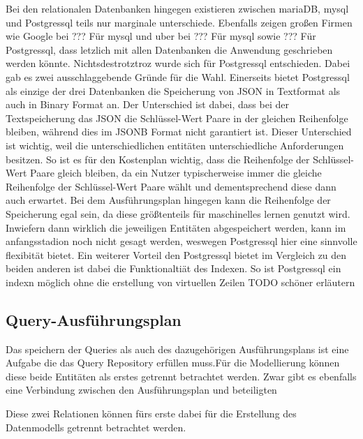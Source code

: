 Bei den relationalen Datenbanken hingegen existieren zwischen mariaDB, mysql und Postgressql teils nur marginale unterschiede. Ebenfalls zeigen großen Firmen wie Google bei ??? Für mysql und uber bei ??? Für mysql sowie ??? Für Postgressql, dass letzlich mit allen Datenbanken die Anwendung geschrieben werden könnte. Nichtsdestrotztroz wurde sich für Postgressql entschieden. Dabei gab es zwei ausschlaggebende Gründe für die Wahl. Einerseits bietet Postgressql als einzige der drei Datenbanken die Speicherung von JSON in Textformat als auch in Binary Format an. Der Unterschied ist dabei, dass bei der Textspeicherung das JSON die Schlüssel-Wert Paare in der gleichen Reihenfolge bleiben, während dies im JSONB Format nicht garantiert ist. Dieser Unterschied ist wichtig, weil die unterschiedlichen entitäten unterschiedliche Anforderungen besitzen. So ist es für den Kostenplan wichtig, dass die Reihenfolge der Schlüssel-Wert Paare gleich bleiben, da ein Nutzer typischerweise immer die gleiche  Reihenfolge der Schlüssel-Wert Paare wählt und dementsprechend diese dann auch erwartet. Bei dem Ausführungsplan hingegen kann die Reihenfolge der Speicherung egal sein, da diese größtenteils für maschinelles lernen genutzt wird. Inwiefern dann wirklich die jeweiligen Entitäten abgespeichert werden, kann im anfangsstadion noch nicht gesagt werden, weswegen Postgressql hier eine sinnvolle flexibität bietet. Ein weiterer Vorteil den Postgressql bietet im Vergleich zu den beiden anderen ist dabei die Funktionaltiät des Indexen. So ist Postgressql ein indexn möglich ohne die erstellung von virtuellen Zeilen TODO schöner erläutern






\subsection{Query-Ausführungsplan}
Das speichern der Queries als auch des dazugehörigen Ausführungsplans ist eine Aufgabe die das Query Repository erfüllen muss.Für die Modellierung können diese beide Entitäten als erstes getrennt betrachtet werden. Zwar gibt es ebenfalls eine Verbindung zwischen den Ausführungsplan und  beteiligten 



 Diese zwei Relationen können fürs erste 
dabei für die Erstellung des Datenmodells getrennt betrachtet werden.  

